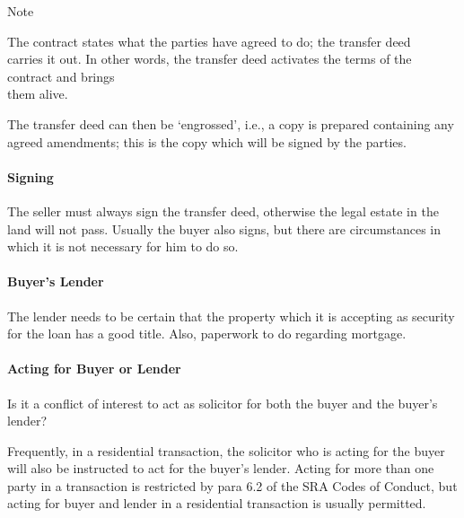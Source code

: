 \documentclass[
]{article}
\newenvironment{env-881a4bd6-779e-4404-ae5b-86f77846f864}
{
    \savenotes\tcolorbox[blanker,breakable,left=5pt,borderline west={2pt}{-4pt}{blue}]
}
{
    \endtcolorbox\spewnotes
}
\newenvironment{env-d6ce83a0-f7a8-46b6-be95-b1235f1feb63}
{
    \savenotes\tcolorbox[blanker,breakable,left=5pt,borderline west={2pt}{-4pt}{gray}]
}
{
    \endtcolorbox\spewnotes
}
\begin{document}
\begin{env-881a4bd6-779e-4404-ae5b-86f77846f864}

Note

The contract states what the parties have agreed to do; the transfer
deed\\
carries it out. In other words, the transfer deed activates the terms of
the contract and brings\\
them alive.

\end{env-881a4bd6-779e-4404-ae5b-86f77846f864}

The transfer deed can then be `engrossed', i.e., a copy is prepared
containing any agreed amendments; this is the copy which will be signed
by the parties.

\hypertarget{signing}{%
\paragraph{Signing}\label{signing}}

The seller must always sign the transfer deed, otherwise the legal
estate in the land will not pass. Usually the buyer also signs, but
there are circumstances in which it is not necessary for him to do so.

\hypertarget{buyers-lender}{%
\paragraph{Buyer's Lender}\label{buyers-lender}}

The lender needs to be certain that the property which it is accepting
as security for the loan has a good title. Also, paperwork to do
regarding mortgage.

\hypertarget{acting-for-buyer-or-lender}{%
\paragraph{Acting for Buyer or
Lender}\label{acting-for-buyer-or-lender}}

\begin{env-d6ce83a0-f7a8-46b6-be95-b1235f1feb63}

Is it a conflict of interest to act as solicitor for both the buyer and
the buyer's lender?

Frequently, in a residential transaction, the solicitor who is acting
for the buyer will also be instructed to act for the buyer's lender.
Acting for more than one party in a transaction is restricted by para
6.2 of the SRA Codes of Conduct, but acting for buyer and lender in a
residential transaction is usually permitted.

\end{env-d6ce83a0-f7a8-46b6-be95-b1235f1feb63}
\end{document}
